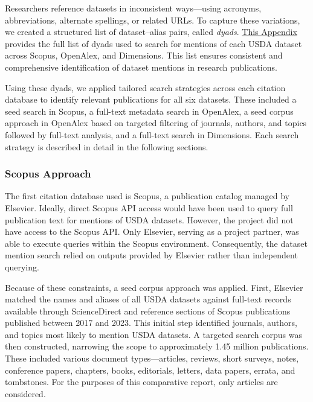 \documentclass[
  letterpaper,
  DIV=11,
  numbers=noendperiod]{scrartcl}
\begin{document}
Researchers reference datasets in inconsistent ways---using acronyms,
abbreviations, alternate spellings, or related URLs. To capture these
variations, we created a structured list of dataset--alias pairs, called
\emph{dyads}. \href{./appendices/app_dyads.qmd}{This Appendix} provides
the full list of dyads used to search for mentions of each USDA dataset
across Scopus, OpenAlex, and Dimensions. This list ensures consistent
and comprehensive identification of dataset mentions in research
publications.

Using these dyads, we applied tailored search strategies across each
citation database to identify relevant publications for all six
datasets. These included a seed search in Scopus, a full-text metadata
search in OpenAlex, a seed corpus approach in OpenAlex based on targeted
filtering of journals, authors, and topics followed by full-text
analysis, and a full-text search in Dimensions. Each search strategy is
described in detail in the following sections.

\subsubsection{Scopus Approach}\label{scopus-approach}

The first citation database used is Scopus, a publication catalog
managed by Elsevier. Ideally, direct Scopus API access would have been
used to query full publication text for mentions of USDA datasets.
However, the project did not have access to the Scopus API. Only
Elsevier, serving as a project partner, was able to execute queries
within the Scopus environment. Consequently, the dataset mention search
relied on outputs provided by Elsevier rather than independent querying.

Because of these constraints, a seed corpus approach was applied. First,
Elsevier matched the names and aliases of all USDA datasets against
full-text records available through ScienceDirect and reference sections
of Scopus publications published between 2017 and 2023. This initial
step identified journals, authors, and topics most likely to mention
USDA datasets. A targeted search corpus was then constructed, narrowing
the scope to approximately 1.45 million publications. These included
various document types---articles, reviews, short surveys, notes,
conference papers, chapters, books, editorials, letters, data papers,
errata, and tombstones. For the purposes of this comparative report,
only articles are considered.
\end{document}
